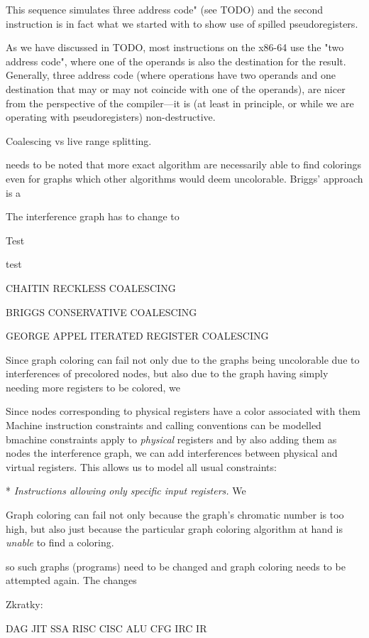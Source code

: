 This sequence simulates \"three address code" (see TODO) and the second instruction
is in fact what we started with to show use of spilled pseudoregisters.


As we have discussed in TODO, most instructions on
the x86-64 use the "two address code", where one of the operands is also the
destination for the result. Generally, three address code (where operations have
two operands and one destination that may or may not coincide with one of the
operands), are nicer from the perspective of the compiler---it is (at least in
principle, or while we are operating with pseudoregisters) non-destructive.





Coalescing vs live range splitting.



%

needs to be noted that
more exact algorithm are necessarily able to find colorings even for graphs
which other algorithms would deem uncolorable. Briggs' approach is a 

The
interference graph has to change to 

\seccc Test

test




CHAITIN RECKLESS COALESCING

BRIGGS CONSERVATIVE COALESCING

GEORGE APPEL ITERATED REGISTER COALESCING



Since graph coloring can fail not only due to the graphs being uncolorable due
to interferences of precolored nodes, but also due to the graph having simply
needing more registers to be colored, we 

Since nodes corresponding to physical registers have a color associated with
them
Machine instruction constraints and calling conventions can be modelled bmachine constraints apply to {\em physical}
registers and by also adding them as nodes the interference graph, we can add
interferences between physical and virtual registers. This allows us to model
all usual constraints:

\begitems
* {\em Instructions allowing only specific input registers.} We 
\enditems

Graph coloring can fail not only because the graph's chromatic number is too
high, but also just because the particular graph coloring algorithm at hand is
{\em unable} to find a coloring.

so such
graphs (programs) need to be changed and graph coloring needs to be attempted
again. The changes






Zkratky:

DAG
JIT
SSA
RISC
CISC
ALU
CFG
IRC
IR
